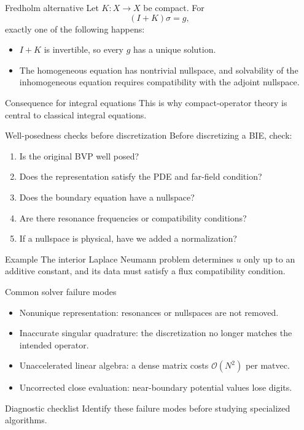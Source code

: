 \documentclass[aspectratio=169,11pt]{beamer}
\newcommand{\cO}{\mathcal{O}}
\begin{document}
\begin{frame}{Fredholm alternative}
\small
Let $K:X\to X$ be compact. For
\[
  (I+K)\sigma=g,
\]
exactly one of the following happens:
\begin{itemize}
  \item $I+K$ is invertible, so every $g$ has a unique solution.
  \item The homogeneous equation has nontrivial nullspace, and solvability of
  the inhomogeneous equation requires compatibility with the adjoint nullspace.
\end{itemize}

\begin{block}{Consequence for integral equations}
This is why compact-operator theory is central to classical integral equations.
\end{block}
\end{frame}

\begin{frame}{Well-posedness checks before discretization}
\small
Before discretizing a BIE, check:
\begin{enumerate}
  \item Is the original BVP well posed?
  \item Does the representation satisfy the PDE and far-field condition?
  \item Does the boundary equation have a nullspace?
  \item Are there resonance frequencies or compatibility conditions?
  \item If a nullspace is physical, have we added a normalization?
\end{enumerate}

\begin{block}{Example}
The interior Laplace Neumann problem determines $u$ only up to an additive
constant, and its data must satisfy a flux compatibility condition.
\end{block}
\end{frame}

\begin{frame}{Common solver failure modes}
\small
\begin{itemize}
  \item Nonunique representation: resonances or nullspaces are not removed.
  \item Inaccurate singular quadrature: the discretization no longer matches
  the intended operator.
  \item Unaccelerated linear algebra: a dense matrix costs $\cO(N^2)$ per
  matvec.
  \item Uncorrected close evaluation: near-boundary potential values lose
  digits.
\end{itemize}

\begin{block}{Diagnostic checklist}
Identify these failure modes before studying specialized algorithms.
\end{block}
\end{frame}
\end{document}
